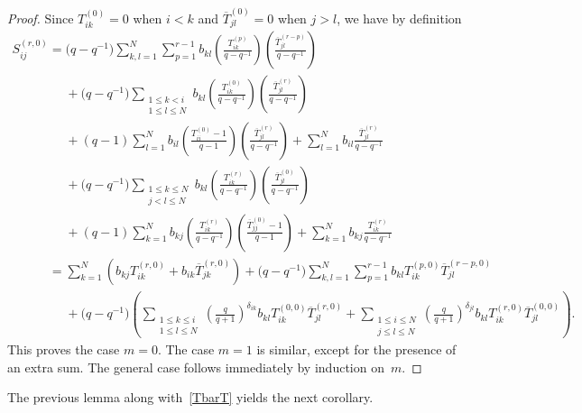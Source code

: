 \documentclass[11pt]{article}
\numberwithin{theorem}{section}
\numberwithin{proposition}{section}
\numberwithin{lemma}{section}
\numberwithin{corollary}{section}
\numberwithin{definition}{section}
\numberwithin{example}{section}
\numberwithin{remark}{section}
\numberwithin{note}{section}
\numberwithin{equation}{section}
\begin{document}
\begin{proof}
Since $T_{ik}^{(0)}=0$ when $i<k$ and $\overline{T}_{jl}^{(0)}=0$ when $j>l$, we have by def\/inition
\begin{gather*}
S_{ij}^{(r,0)}= \big(q-q^{-1}\big) \sum\limits_{k,l=1}^N \sum\limits_{p=1}^{r-1} b_{kl} \left(\frac{T_{ik}^{(p)}}{q-q^{-1}}
\right) \left(\frac{\overline{T}_{jl}^{(r-p)}}{q-q^{-1}} \right)
\\
\phantom{S_{ij}^{(r,0)}=}{}
+ \big(q-q^{-1}\big)\sum\limits_{\substack{1 \leq k < i\\ 1 \leq l \leq N}} b_{kl} \left(\frac{T_{ik}^{(0)}}{q-q^{-1}} \right)
\left(\frac{\overline{T}_{jl}^{(r)}}{q-q^{-1}}\right)
\\
\phantom{S_{ij}^{(r,0)}=}{}
+ (q-1) \sum\limits_{l=1}^N b_{il} \left(\frac{T_{ii}^{(0)}-1}{q-1} \right)
\left(\frac{\overline{T}_{jl}^{(r)}}{q-q^{-1}}\right) + \sum\limits_{l=1}^N b_{il}
\frac{\overline{T}_{jl}^{(r)}}{q-q^{-1}}
\\
\phantom{S_{ij}^{(r,0)}=}{}
+ \big(q-q^{-1}\big) \sum\limits_{\substack{1 \leq k \leq N\\ j < l \leq N}} b_{kl} \left(\frac{T_{ik}^{(r)}}{q-q^{-1}} \right)
\left(\frac{\overline{T}_{jl}^{(0)}}{q-q^{-1}}\right)
\\
\phantom{S_{ij}^{(r,0)}=}{}
+ (q-1) \sum\limits_{k=1}^N b_{kj} \left(\frac{T_{ik}^{(r)}}{q-q^{-1}} \right)
\left(\frac{\overline{T}_{jj}^{(0)}-1}{q-1}\right) + \sum\limits_{k=1}^N b_{kj} \frac{T_{ik}^{(r)}}{q-q^{-1}}
\\
\phantom{S_{ij}^{(r,0)}}{}
= \sum\limits_{k=1}^N \left(b_{kj} T_{ik}^{(r,0)} + b_{ik} \overline{T}_{jk}^{(r,0)} \right) + \big(q-q^{-1}\big)
\sum\limits_{k,l=1}^N \sum\limits_{p=1}^{r-1} b_{kl} T_{ik}^{(p,0)} \overline{T}_{jl}^{(r-p,0)}
\\
\phantom{S_{ij}^{(r,0)}=}{}
+ \big(q-q^{-1}\big) \! \left(\sum\limits_{\substack{1 \leq k \leq i\\ 1 \leq l \leq N}}\! \left(\frac{q}{q+1}\right)^{\delta_{ik}}\!
b_{kl} T_{ik}^{(0,0)} \overline{T}_{jl}^{(r,0)} + \sum\limits_{\substack{1 \leq i \leq N\\ j \leq l \leq N}}\!
\left(\frac{q}{q+1}\right)^{\delta_{jl}} \! b_{kl} T_{ik}^{(r,0)} \overline{T}_{jl}^{(0,0)} \right).
\end{gather*}
This proves the case $m=0$.
The case $m=1$ is similar, except for the presence of an extra sum.
The general case follows immediately by induction on~$m$.
\end{proof}

The previous lemma along with~\eqref{TbarT} yields the next corollary.
\end{document}
